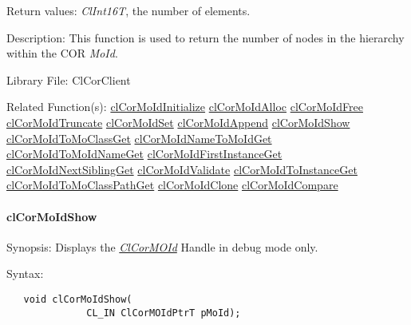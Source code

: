 \begin{Desc}
\item[Return values:]{\em Cl\-Int16T\/}, the number of elements.\end{Desc}
\begin{Desc}
\item[Description:]This function is used to return the number of nodes in the hierarchy within the COR {\em Mo\-Id\/}.\end{Desc}
\begin{Desc}
\item[Library File:]Cl\-Cor\-Client\end{Desc}
\begin{Desc}
\item[Related Function(s):]\hyperlink{group__group13}{cl\-Cor\-Mo\-Id\-Initialize} \hyperlink{group__group13}{cl\-Cor\-Mo\-Id\-Alloc} \hyperlink{group__group13}{cl\-Cor\-Mo\-Id\-Free} \hyperlink{group__group13}{cl\-Cor\-Mo\-Id\-Truncate} \hyperlink{group__group13}{cl\-Cor\-Mo\-Id\-Set} \hyperlink{group__group13}{cl\-Cor\-Mo\-Id\-Append} \hyperlink{group__group13}{cl\-Cor\-Mo\-Id\-Show} \hyperlink{group__group13}{cl\-Cor\-Mo\-Id\-To\-Mo\-Class\-Get} \hyperlink{group__group13}{cl\-Cor\-Mo\-Id\-Name\-To\-Mo\-Id\-Get} \hyperlink{group__group13}{cl\-Cor\-Mo\-Id\-To\-Mo\-Id\-Name\-Get} \hyperlink{group__group13}{cl\-Cor\-Mo\-Id\-First\-Instance\-Get} \hyperlink{group__group13}{cl\-Cor\-Mo\-Id\-Next\-Sibling\-Get} \hyperlink{group__group13}{cl\-Cor\-Mo\-Id\-Validate} \hyperlink{group__group13}{cl\-Cor\-Mo\-Id\-To\-Instance\-Get} \hyperlink{group__group13}{cl\-Cor\-Mo\-Id\-To\-Mo\-Class\-Path\-Get} \hyperlink{group__group13}{cl\-Cor\-Mo\-Id\-Clone} \hyperlink{group__group13}{cl\-Cor\-Mo\-Id\-Compare} \end{Desc}
\hypertarget{pagecor236}{}\paragraph{cl\-Cor\-Mo\-Id\-Show}\label{pagecor236}
\begin{Desc}
\item[Synopsis:]Displays the {\em \hyperlink{struct_cl_cor_m_o_id}{Cl\-Cor\-MOId}\/} Handle in debug mode only.\end{Desc}
\begin{Desc}
\item[Syntax:]

\footnotesize\begin{verbatim}   void clCorMoIdShow(
              CL_IN ClCorMOIdPtrT pMoId);
\end{verbatim}
\normalsize
\end{Desc}
